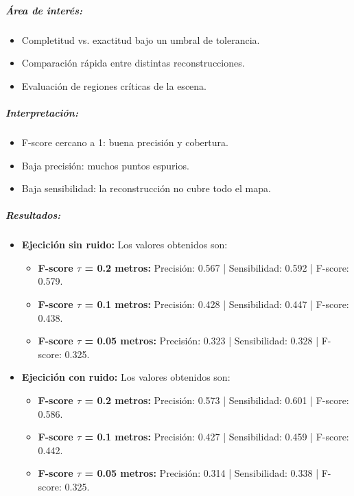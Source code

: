 \documentclass[12pt, a4paper, twoside]{article}
\begin{document}
\subparagraph{Área de interés:}
\begin{itemize}
  \item Completitud vs. exactitud bajo un umbral de tolerancia.
  \item Comparación rápida entre distintas reconstrucciones.
  \item Evaluación de regiones críticas de la escena.
\end{itemize}

\subparagraph{Interpretación:}
\begin{itemize}
  \item F-score cercano a 1: buena precisión y cobertura.  
  \item Baja precisión: muchos puntos espurios.
  \item Baja sensibilidad: la reconstrucción no cubre todo el mapa.
\end{itemize}

\subparagraph{Resultados:}
\begin{itemize}
  \item \textbf{Ejecición sin ruido:} Los valores obtenidos son:
  \begin{itemize}
    \item \textbf{F-score \(\tau\) = 0.2 metros:} Precisión: 0.567 | Sensibilidad: 0.592 | F-score: 0.579.
    \item \textbf{F-score \(\tau\) = 0.1 metros:} Precisión: 0.428 | Sensibilidad: 0.447 | F-score: 0.438.
    \item \textbf{F-score \(\tau\) = 0.05 metros:} Precisión: 0.323 | Sensibilidad: 0.328 | F-score: 0.325.
  \end{itemize}
  \item \textbf{Ejecición con ruido:} Los valores obtenidos son:
  \begin{itemize}
    \item \textbf{F-score \(\tau\) = 0.2 metros:} Precisión: 0.573 | Sensibilidad: 0.601 | F-score: 0.586.
    \item \textbf{F-score \(\tau\) = 0.1 metros:} Precisión: 0.427 | Sensibilidad: 0.459 | F-score: 0.442.
    \item \textbf{F-score \(\tau\) = 0.05 metros:} Precisión: 0.314 | Sensibilidad: 0.338 | F-score: 0.325.
  \end{itemize}
\end{itemize}
\end{document}
